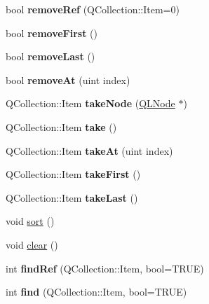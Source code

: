 \begin{DoxyCompactItemize}
bool {\bfseries remove\+Ref} (Q\+Collection\+::\+Item=0)
\item 
\mbox{\label{class_q_g_list_a8fac66ae43bc16f0721d9a3ec63a3cf5}} 
bool {\bfseries remove\+First} ()
\item 
\mbox{\label{class_q_g_list_ae92ecdd681011d8ab6f4e8517b5e24b9}} 
bool {\bfseries remove\+Last} ()
\item 
\mbox{\label{class_q_g_list_a2d91e82edec9c97315c3b3b237fbb492}} 
bool {\bfseries remove\+At} (uint index)
\item 
\mbox{\label{class_q_g_list_a256c045c464961c22f30259083c80a3c}} 
Q\+Collection\+::\+Item {\bfseries take\+Node} (\mbox{\hyperlink{class_q_l_node}{Q\+L\+Node}} $\ast$)
\item 
\mbox{\label{class_q_g_list_a4b926803feca834f03fefa6bf614dcb1}} 
Q\+Collection\+::\+Item {\bfseries take} ()
\item 
\mbox{\label{class_q_g_list_a7bcc304d043e120dc97c09e0253da756}} 
Q\+Collection\+::\+Item {\bfseries take\+At} (uint index)
\item 
\mbox{\label{class_q_g_list_ab9dccfb30688be7b75f330bf78268c11}} 
Q\+Collection\+::\+Item {\bfseries take\+First} ()
\item 
\mbox{\label{class_q_g_list_a7e31eb310e365d503d6286f5fb1b0b49}} 
Q\+Collection\+::\+Item {\bfseries take\+Last} ()
\item 
void \mbox{\hyperlink{class_q_g_list_aafb785818e1ff9a3a72daacabd549b54}{sort}} ()
\item 
void \mbox{\hyperlink{class_q_g_list_a9b89540497bfcf674466dcf9e343d981}{clear}} ()
\item 
\mbox{\label{class_q_g_list_a67bc1cdeeadadd5c0c6fd976c62892b8}} 
int {\bfseries find\+Ref} (Q\+Collection\+::\+Item, bool=T\+R\+UE)
\item 
\mbox{\label{class_q_g_list_a604fb543fc8b0f989e7fde06bdb3ea9c}} 
int {\bfseries find} (Q\+Collection\+::\+Item, bool=T\+R\+UE)
\item 

\end{DoxyCompactItemize}
